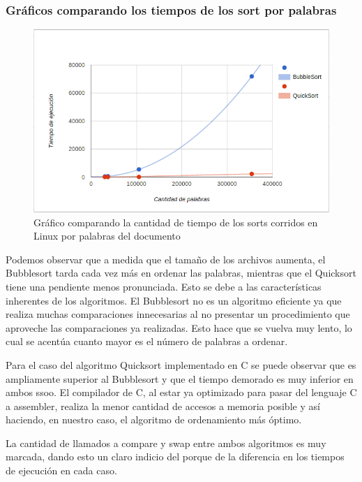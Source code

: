 \documentclass[a4paper,10pt]{article}
\begin{document}
\subsubsection{Gr\'aficos comparando los tiempos de los sort por palabras}

\begin{figure}[h!]
	\centering
	\includegraphics[scale=0.7]{./recursos/ejecVsPala.png}
	\caption{Gr\'afico comparando la cantidad de tiempo de los sorts corridos en Linux por palabras del documento}
\end{figure}


\newpage
\bigskip
Podemos observar que a medida que el tamaño de los archivos aumenta, el Bubblesort tarda cada vez más en ordenar las palabras, mientras que el Quicksort tiene una pendiente menos pronunciada. Esto se debe a las características inherentes de los algoritmos. El Bubblesort no es un algoritmo eficiente ya que realiza muchas comparaciones innecesarias al no presentar un procedimiento que aproveche las comparaciones ya realizadas. Esto hace que se vuelva muy lento, lo cual se acent\'ua cuanto mayor es el n\'umero de palabras a ordenar.

Para el caso del algoritmo Quicksort implementado en C se puede observar que es ampliamente superior al Bubblesort y que el tiempo demorado es muy inferior en ambos ssoo. El compilador de C, al estar ya optimizado para pasar del lenguaje C a assembler, realiza la menor cantidad de accesos a memoria posible y así haciendo, en nuestro caso, el algoritmo de ordenamiento más óptimo.

La cantidad de llamados a compare y swap entre ambos algoritmos es muy marcada, dando esto un claro indicio del porque de la diferencia en los tiempos de ejecuci\'on en cada caso.
\end{document}
